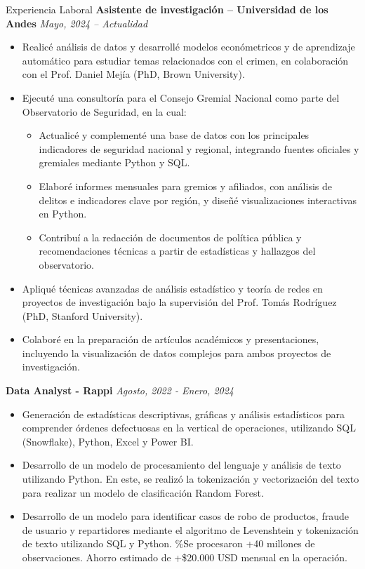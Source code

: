 \documentclass{resume}
\begin{document}
\begin{rSection}{Experiencia Laboral}
{\bf Asistente de investigación – Universidad de los Andes} \hfill {\em Mayo, 2024 – Actualidad}
\begin{itemize}
    \item Realicé análisis de datos y desarrollé modelos económetricos y de aprendizaje automático para estudiar temas relacionados con el crimen, en colaboración con el Prof. Daniel Mejía (PhD, Brown University).
    \item Ejecuté una consultoría para el Consejo Gremial Nacional como parte del Observatorio de Seguridad, en la cual:
    \begin{itemize}
        \item Actualicé y complementé una base de datos con los principales indicadores de seguridad nacional y regional, integrando fuentes oficiales y gremiales mediante Python y SQL.
        \item Elaboré informes mensuales para gremios y afiliados, con análisis de delitos e indicadores clave por región, y diseñé visualizaciones interactivas en Python.
        \item Contribuí a la redacción de documentos de política pública y recomendaciones técnicas a partir de estadísticas y hallazgos del observatorio.
    \end{itemize}
    \item Apliqué técnicas avanzadas de análisis estadístico y teoría de redes en proyectos de investigación bajo la supervisión del Prof. Tomás Rodríguez (PhD, Stanford University).
    \item Colaboré en la preparación de artículos académicos y presentaciones, incluyendo la visualización de datos complejos para ambos proyectos de investigación.
\end{itemize}

{\bf Data Analyst - Rappi} \hfill {\em Agosto, 2022 - Enero, 2024} 
\begin{itemize}
    \item Generación de estadísticas descriptivas, gráficas y análisis estadísticos para comprender órdenes defectuosas en la vertical de operaciones, utilizando SQL (Snowflake), Python, Excel y Power BI. 
    \item Desarrollo de un modelo de procesamiento del lenguaje y análisis de texto utilizando Python. En este, se realizó la tokenización y vectorización del texto para realizar un modelo de clasificación Random Forest. %
    \item Desarrollo de un modelo para identificar casos de robo de productos, fraude de usuario y repartidores mediante el algoritmo de Levenshtein y tokenización de texto utilizando SQL y Python. \%Se procesaron +40 millones de observaciones. Ahorro estimado de +\$20.000 USD mensual en la operación.
\end{itemize}


\end{rSection}
\end{document}
